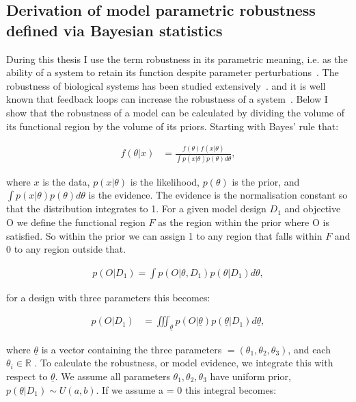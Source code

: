 	


\subsection{Derivation of model parametric robustness defined via Bayesian statistics}
\label{sec:rob_back}
During this thesis I use the term robustness in its parametric meaning, i.e. as the ability of a system to retain its function despite parameter perturbations~\autocite{Stelling:2004wo}. The robustness of biological systems has been studied extensively~\autocite{Barkai:1997cd, Stelling:2004wo, Prill:2005fq, Kim:2006uk, Kitano:2007cp, Hafner:2009ct, Shinar:2010dd, ZamoraSillero:2011jw, Woods:2016eh}. and it is well known that feedback loops can increase the robustness of a system~\autocite{Becskei:2000ft,	 DOYLE:2005ul}. Below I show that the robustness of a model can be calculated by dividing the volume of its functional region by the volume of its priors. Starting with Bayes' rule that:

\begin{align}
	f(\theta|x) &= \frac{f(\theta)f(x|\theta)}{\int p(x|\theta)p(\theta)d\theta},
\end{align}

\noindent where $x$ is the data, $p(x|\theta)$ is the likelihood, $p(\theta)$ is the prior, and $\displaystyle \int p(x|\theta)p(\theta)d\theta$ is the evidence. The evidence is the normalisation constant so that the distribution integrates to 1. For a given model design $D_1$ and objective O we define the functional region $F$ as the region within the prior where O is satisfied. So within the prior we can assign 1 to any region that falls within $F$ and 0 to any region outside that. 

\begin{align}
p(O|D_1) = \int p(O|\theta,D_1)p(\theta|D_1)d\theta,
\end{align}

\noindent for a design with three parameters this becomes:

\begin{align}
p(O|D_1) &= \displaystyle \iiint_{\underline{\theta}} p(O|\underline{\theta})p(\underline{\theta}|D_1)d\underline{\theta},
\end{align}

\noindent where $\underline{\theta}$ is a vector containing the three parameters $ = (\theta_1, \theta_2,\theta_3)$, and each $\theta_i \in \mathbb{R} $ . To calculate the robustness, or model evidence, we integrate this with respect to $\underline{\theta}$. We assume  all parameters $\theta_1, \theta_2,\theta_3$ have uniform prior, $p(\underline{\theta}|D_1) \sim U(a, b)$. If we assume a = 0 this integral becomes:

